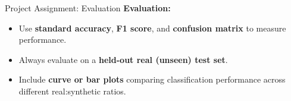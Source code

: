   \begin{refsection}
  \begin{frame}{Project Assignment: Evaluation}
    \textbf{Evaluation:}
    \begin{itemize}
      \item Use \textbf{standard accuracy}, \textbf{F1 score}, and \textbf{confusion matrix} to measure performance.
      \item Always evaluate on a \textbf{held-out real (unseen) test set}.
      \item Include \textbf{curve or bar plots} comparing classification performance across different real:synthetic ratios.
    \end{itemize}
    \bottomleftrefs
  \end{frame}
  \end{refsection}
  





